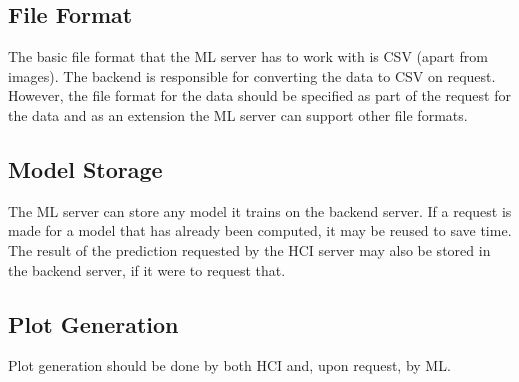 \documentclass{article}
\begin{document}
\subsection{File Format}
The basic file format that the ML server has to work with is CSV (apart from images). The backend is responsible for converting the data to CSV on request. However, the file format for the data should be specified as part of the request for the data and as an extension the ML server can support other file formats.

\subsection{Model Storage}
The ML server can store any model it trains on the backend server. If a request is made for a model that has already been computed, it may be reused to save time. The result of the prediction requested by the HCI server may also be stored in the backend server, if it were to request that.

\subsection{Plot Generation}
Plot generation should be done by both HCI and, upon request, by ML.
\end{document}
